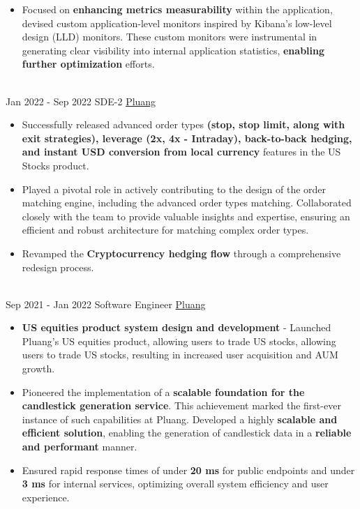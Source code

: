 \documentclass[letterpaper]{twentysecondcv} %
\begin{document}
\begin{twenty}
{\begin{itemize}
        \item Focused on \textbf{enhancing metrics measurability} within the application, devised custom application-level monitors inspired by Kibana's low-level design (LLD) monitors. These custom monitors were instrumental in generating clear visibility into internal application statistics, \textbf{enabling further optimization} efforts.
        \end{itemize}}
    \\   
    \twentyitem
   		{Jan 2022 -}
		{Sep 2022}
        {SDE-2}
        {\href{https://pluang.com}{Pluang}}
        {}
        {\begin{itemize}
        \item Successfully released advanced order types \textbf{(stop, stop limit, along with exit strategies), leverage (2x, 4x - Intraday), back-to-back hedging, and instant USD conversion from local currency} features in the US Stocks product.
        \item Played a pivotal role in actively contributing to the design of the order matching engine, including the advanced order types matching. Collaborated closely with the team to provide valuable insights and expertise, ensuring an efficient and robust architecture for matching complex order types.
        \item Revamped the \textbf{Cryptocurrency hedging flow} through a comprehensive redesign process.
        \end{itemize}}
    \\
    \twentyitem
   		{Sep 2021 -}
		{Jan 2022}
        {Software Engineer}
        {\href{https://pluang.com/}{Pluang}}
        {}
        {\begin{itemize}
        \item \textbf{US equities product system design and development} - Launched Pluang's US equities product, allowing users to trade US stocks, allowing users to trade US stocks, resulting in increased user acquisition and AUM growth.
        \item Pioneered the implementation of a \textbf{scalable foundation for the candlestick generation service}. This achievement marked the first-ever instance of such capabilities at Pluang. Developed a highly \textbf{scalable and efficient solution}, enabling the generation of candlestick data in a \textbf{reliable and performant} manner.
        \item Ensured rapid response times of under \textbf{20 ms} for public endpoints and under \textbf{3 ms} for internal services, optimizing overall system efficiency and user experience.
        \end{itemize}}
    \\
\end{twenty}
\end{document}
